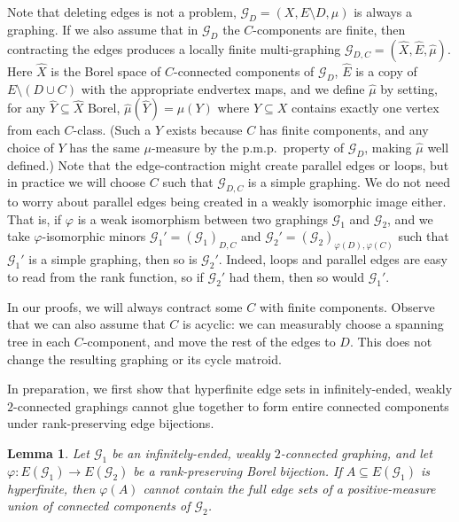 \documentclass{article}
\theoremstyle{plain}
\newtheorem{lem}[thm]{Lemma}
\theoremstyle{definition}
\newcommand{\cG}{\mathcal{G}}
\newcommand{\fg}{\varphi}
\begin{document}
Note that deleting edges is not a problem, $\cG_D=(X,E\setminus D,\mu)$ is always a graphing. If we also assume that in $\cG_D$ the $C$-components are finite, then contracting the edges produces a locally finite multi-graphing $\cG_{D,C} = (\hat X, \hat E, \hat\mu)$. Here $\hat X$ is the Borel space of $C$-connected components of $\cG_D$, $\hat E$ is a copy of $E\setminus (D\cup C)$ with the appropriate endvertex maps, and we define $\hat\mu$ by setting, for any $\hat Y \subseteq \hat X$ Borel, $\hat{\mu}(\hat Y) = \mu(Y)$ where $Y \subseteq X$ contains exactly one vertex from each $C$-class. (Such a $Y$ exists because $C$ has finite components, and any choice of $Y$ has the same $\mu$-measure by the p.m.p.\ property of $\cG_D$, making $\hat\mu$ well defined.) Note that the edge-contraction might create parallel edges or loops, but in practice we will choose $C$ such that $\cG_{D,C}$ is a simple graphing. We do not need to worry about parallel edges being created in a weakly isomorphic image either. That is, if $\varphi$ is a weak isomorphism between two graphings $\cG_1$ and $\cG_2$, and we take $\varphi$-isomorphic minors $\cG_1' = (\cG_1)_{D,C}$ and $\cG_2' = (\cG_2)_{\varphi(D),\varphi(C)}$ such that $\cG_1'$ is a simple graphing, then so is $\cG_2'$. Indeed, loops and parallel edges are easy to read from the rank function, so if $\cG_2'$ had them, then so would $\cG_1'$.

In our proofs, we will always contract some $C$ with finite components. Observe that we can also assume that $C$ is acyclic: we can measurably choose a spanning tree in each $C$-component, and move the rest of the edges to $D$. This does not change the resulting graphing or its cycle matroid. 

In preparation, we first show that hyperfinite edge sets in infinitely-ended, weakly $2$-connected graphings cannot glue together to form entire connected components under rank-preserving edge bijections.

\begin{lem} \label{lem:no_full_components}
Let $\cG_1$ be an infinitely-ended, weakly $2$-connected graphing, and let $\fg:E(\cG_1)\to E(\cG_2)$ be a rank-preserving Borel bijection. If $A\subseteq E(\cG_1)$ is hyperfinite, then $\fg(A)$ cannot contain the full edge sets of a positive-measure union of connected components of $\cG_2$.
\end{lem}
\end{document}
